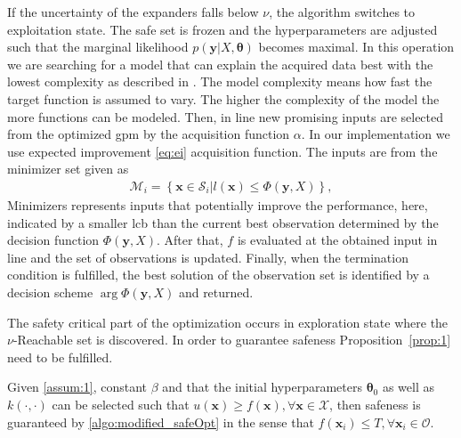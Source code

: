 \documentclass{ifacconf}
\newcounter{part}
\newcommand{\linea}[1]{line\:{\footnotesize \textbf{(#1)}}}
\newcommand{\bx}{\bm{x}}
\begin{document}
If the uncertainty of the expanders falls below \(\nu\), the algorithm switches to exploitation state. The safe set is frozen and the hyperparameters are adjusted such that the marginal likelihood \(p(\bm{y}\vert X,\bm{\theta})\) becomes maximal. In this operation we are searching for a model that can explain the acquired data best with the lowest complexity as described in \cite{williams2006gaussian}. The model complexity means how fast the target function is assumed to vary. The higher the complexity of the model the more functions can be modeled. Then, in \linea{12} new promising inputs are selected from the optimized \gls{gpm} by the acquisition function \(\alpha\). In our implementation we use expected improvement \eqref{eq:ei} acquisition function. The inputs are from the minimizer set given as
\begin{align}
    \mathcal{M}_i = \left\{\bm{x}\in\mathcal{S}_i\lvert l(\bm{x}) \leq \Phi(\bm{y},X)\right\},
\end{align} 
Minimizers represents inputs that potentially improve the performance, here, indicated by a smaller \gls{lcb} than the current best observation determined by the decision function \(\Phi(\bm{y},X)\).
After that, \(f\) is evaluated at the obtained input in \linea{14} and the set of observations is updated. Finally, when the termination condition is fulfilled, the best solution of the observation set is identified by a decision scheme \(\arg\Phi(\bm{y},X)\) and returned.

The safety critical part of the optimization occurs in exploration state where the \(\nu\)-Reachable set is discovered. In order to guarantee safeness Proposition~\ref{prop:1} need to be fulfilled.
\begin{prop}
    Given \cref{assum:1}, constant \(\beta\) and that the initial hyperparameters \(\bm{\theta}_0\) as well as \(k(\cdot,\cdot)\) can be selected such that \(u(\bx)\geq f(\bx), \forall \bx \in \mathcal{X}\), then safeness is guaranteed by \cref{algo:modified_safeOpt} in the sense that \(f(\bx_i) \leq T, \forall \bx_i \in \mathcal{O}\).
\label{prop:1}
\end{prop}
\end{document}
